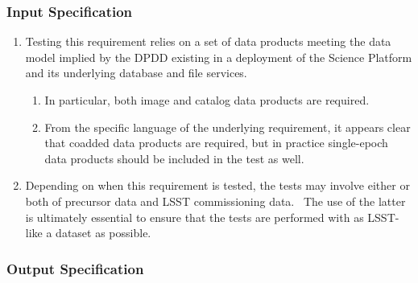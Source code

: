 \subsubsection{Input Specification}
\begin{enumerate}
\tightlist
\item
  Testing this requirement relies on a set of data products meeting the
  data model implied by the DPDD existing in a deployment of the Science
  Platform and its underlying database and file services.

  \begin{enumerate}
  \tightlist
  \item
    In particular, both image and catalog data products are required.
  \item
    From the specific language of the underlying requirement, it appears
    clear that coadded data products are required, but in practice
    single-epoch data products should be included in the test as well.
  \end{enumerate}
\item
  Depending on when this requirement is tested, the tests may involve
  either or both of precursor data and LSST commissioning data. ~The use
  of the latter is ultimately essential to ensure that the tests are
  performed with as LSST-like a dataset as possible.
\end{enumerate}


\subsubsection{Output Specification}

